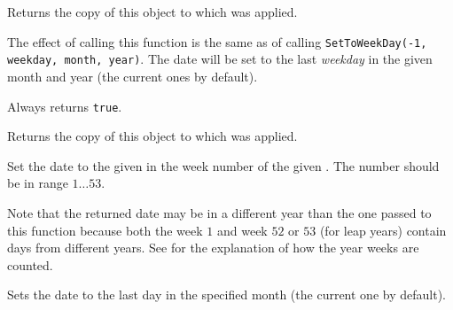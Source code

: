 \label{wxdatetimegetweekday2}


Returns the copy of this object to which
 was applied.


\label{wxdatetimesettolastweekday}


The effect of calling this function is the same as of calling
{\tt SetToWeekDay(-1, weekday, month, year)}. The date will be set to the last
{\it weekday} in the given month and year (the current ones by default).

Always returns {\tt true}.


\label{wxdatetimegetlastweekday}


Returns the copy of this object to which
 was applied.


\label{wxdatetimesettoweekofyear}


Set the date to the given  in the week number  of the
given  . The number should be in range $1\ldots53$.

Note that the returned date may be in a different year than the one passed to
this function because both the week $1$ and week $52$ or $53$ (for leap years)
contain days from different years. See
 for the explanation of how the
year weeks are counted.


\label{wxdatetimesettolastmonthday}


Sets the date to the last day in the specified month (the current one by
default).

